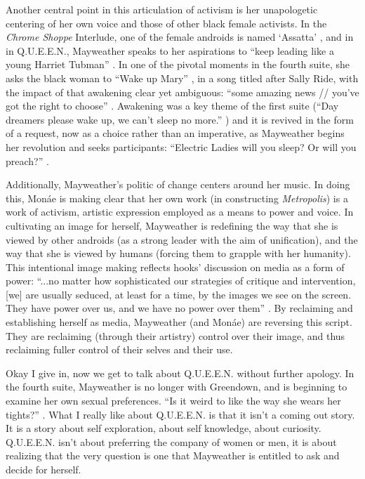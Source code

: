 \documentclass[a4paper, 11pt]{article} %
\begin{document}
Another central point in this articulation of activism is her unapologetic centering of her own voice and those of other black female activists.
In the \emph{Chrome Shoppe} Interlude, one of the female androids is named `Assatta' \cite{chromeshoppe}, and in in Q.U.E.E.N., Mayweather speaks to her aspirations to ``keep leading like a young Harriet Tubman'' \cite{queen}.
In one of the pivotal moments in the fourth suite, she asks the black woman to ``Wake up Mary'' \cite{sallyride}, in a song titled after Sally Ride, with the impact of that awakening clear yet ambiguous: ``some amazing news // you've got the right to choose'' \cite{sallyride}. 
Awakening was a key theme of the first suite (``Day dreamers please wake up, we can't sleep no more.'' \cite{sincerelyjane}) and it is revived in the form of a request, now as a choice rather than an imperative, as Mayweather begins her revolution and seeks participants: ``Electric Ladies will you sleep? Or will you preach?'' \cite{queen}.

Additionally, Mayweather's politic of change centers around her music.
In doing this, Mon\'ae is making clear that her own work (in constructing \emph{Metropolis}) is a work of activism, artistic expression employed as a means to power and voice.
In cultivating an image for herself, Mayweather is redefining the way that she is viewed by other androids (as a strong leader with the aim of unification), and the way that she is viewed by humans (forcing them to grapple with her humanity).
This intentional image making reflects hooks' discussion on media as a form of power: ``...no matter how sophisticated our strategies of critique and intervention, [we] are usually seduced, at least for a time, by the images we see on the screen. They have power over us, and we have no power over them'' \cite{hooksreeltoreal}.
By reclaiming and establishing herself as media, Mayweather (and Mon\'ae) are reversing this script.
They are reclaiming (through their artistry) control over their image, and thus reclaiming fuller control of their selves and their use.

Okay I give in, now we get to talk about Q.U.E.E.N. without further apology.
In the fourth suite, Mayweather is no longer with Greendown, and is beginning to examine her own sexual preferences.
``Is it weird to like the way she wears her tights?'' \cite{queen}.
What I really like about Q.U.E.E.N. is that it isn't a coming out story.
It is a story about self exploration, about self knowledge, about curiosity. 
Q.U.E.E.N. isn't about preferring the company of women or men, it is about realizing that the very question is one that Mayweather is entitled to ask and decide for herself.
\end{document}
